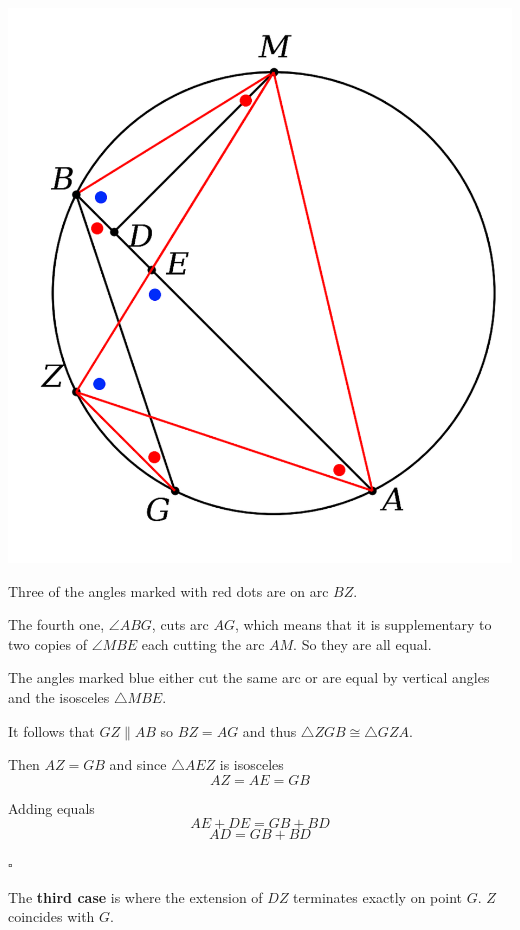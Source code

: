 \documentclass[11pt, oneside]{article}
\begin{document}
\begin{center} \includegraphics [scale=0.40] {bc5b.png} \end{center}

Three of the angles marked with red dots are on arc $BZ$.  

The fourth one, $\angle ABG$, cuts arc $AG$, which means that it is supplementary to two copies of $\angle MBE$ each cutting the arc $AM$.  So they are all equal.

The angles marked blue either cut the same arc or are equal by vertical angles and the isosceles $\triangle MBE$.

It follows that $GZ \parallel AB$ so $BZ = AG$ and thus $\triangle ZGB \cong \triangle GZA$.

Then $AZ = GB$ and since $\triangle AEZ$ is isosceles
\[ AZ = AE = GB \]

Adding equals
\[ AE + DE = GB + BD \]
\[ AD = GB + BD \]

$\square$ 

The \textbf{third case} is where the extension of $DZ$ terminates exactly on point $G$.  $Z$ coincides with $G$.
\end{document}
